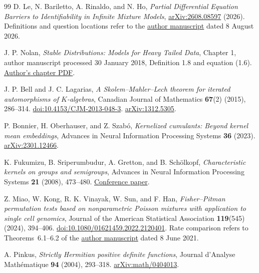 \documentclass[11pt,letterpaper]{article}
\theoremstyle{definition}
\theoremstyle{remark}
\newcommand{\1}{\mathbf 1}
\begin{document}
\begin{thebibliography}{99}
D. Le, N. Bariletto, A. Rinaldo, and N. Ho,
\emph{Partial Differential Equation Barriers to Identifiability in
Infinite Mixture Models},
\href{https://arxiv.org/abs/2608.08597}{arXiv:2608.08597} (2026).
Definitions and question locations refer to the
\href{https://nhatptnk8912.github.io/Identifiability_Infinite_Mixture_final.pdf}{author manuscript}
dated 8 August 2026.


J. P. Nolan,
\emph{Stable Distributions: Models for Heavy Tailed Data},
Chapter 1, author manuscript processed 30 January 2018,
Definition 1.8 and equation (1.6).
\href{https://edspace.american.edu/jpnolan/wp-content/uploads/sites/1720/2020/09/Chap1.pdf}{Author's chapter PDF}.


J. P. Bell and J. C. Lagarias,
\emph{A Skolem--Mahler--Lech theorem for iterated automorphisms of
$K$-algebras}, Canadian Journal of Mathematics \textbf{67}(2)
(2015), 286--314.
\href{https://doi.org/10.4153/CJM-2013-048-3}{doi:10.4153/CJM-2013-048-3}.
\href{https://arxiv.org/abs/1312.5305}{arXiv:1312.5305}.


P. Bonnier, H. Oberhauser, and Z. Szab\'o,
\emph{Kernelized cumulants: Beyond kernel mean embeddings},
Advances in Neural Information Processing Systems \textbf{36} (2023).
\href{https://arxiv.org/abs/2301.12466}{arXiv:2301.12466}.


K. Fukumizu, B. Sriperumbudur, A. Gretton, and B. Sch\"olkopf,
\emph{Characteristic kernels on groups and semigroups},
Advances in Neural Information Processing Systems \textbf{21} (2008),
473--480.
\href{https://papers.neurips.cc/paper/3396-characteristic-kernels-on-groups-and-semigroups.pdf}{Conference paper}.


Z. Miao, W. Kong, R. K. Vinayak, W. Sun, and F. Han,
\emph{Fisher--Pitman permutation tests based on nonparametric Poisson
mixtures with application to single cell genomics},
Journal of the American Statistical Association \textbf{119}(545)
(2024), 394--406.
\href{https://doi.org/10.1080/01621459.2022.2120401}{doi:10.1080/01621459.2022.2120401}.
Rate comparison refers to Theorems~6.1--6.2 of the
\href{https://ramyakv.github.io/testing-poisson-npmle.pdf}{author manuscript}
dated 8 June 2021.


A. Pinkus,
\emph{Strictly Hermitian positive definite functions},
Journal d'Analyse Math\'ematique \textbf{94} (2004), 293--318.
\href{https://arxiv.org/abs/math/0404013}{arXiv:math/0404013}.



\end{thebibliography}
\end{document}
